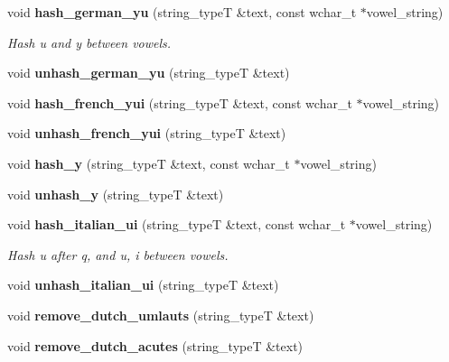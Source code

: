 \begin{DoxyCompactItemize}
\item 
void {\bf hash\+\_\+german\+\_\+yu} (string\+\_\+typeT \&text, const wchar\+\_\+t $\ast$vowel\+\_\+string)\label{classstemming_1_1stem_a2ab335f89cb2e65564a7985156d6ce19}

\begin{DoxyCompactList}\small\item\em Hash \textquotesingle{}u\textquotesingle{} and \textquotesingle{}y\textquotesingle{} between vowels. \end{DoxyCompactList}\item 
void {\bfseries unhash\+\_\+german\+\_\+yu} (string\+\_\+typeT \&text)\label{classstemming_1_1stem_a70ee7015775ebb7d8b98a1724f94448e}

\item 
void {\bf hash\+\_\+french\+\_\+yui} (string\+\_\+typeT \&text, const wchar\+\_\+t $\ast$vowel\+\_\+string)
\item 
void {\bfseries unhash\+\_\+french\+\_\+yui} (string\+\_\+typeT \&text)\label{classstemming_1_1stem_a11e5585424ce623ee7842a039bdfb7cb}

\item 
void {\bfseries hash\+\_\+y} (string\+\_\+typeT \&text, const wchar\+\_\+t $\ast$vowel\+\_\+string)\label{classstemming_1_1stem_ab7cc895f7a16b9bec4a4c4614111ecb3}

\item 
void {\bfseries unhash\+\_\+y} (string\+\_\+typeT \&text)\label{classstemming_1_1stem_acc93df08d3d68d2468aa3e7cf23c7089}

\item 
void {\bf hash\+\_\+italian\+\_\+ui} (string\+\_\+typeT \&text, const wchar\+\_\+t $\ast$vowel\+\_\+string)\label{classstemming_1_1stem_a11d05105fc3e03bd5f2ff581bc4eb6fe}

\begin{DoxyCompactList}\small\item\em Hash u after q, and u, i between vowels. \end{DoxyCompactList}\item 
void {\bfseries unhash\+\_\+italian\+\_\+ui} (string\+\_\+typeT \&text)\label{classstemming_1_1stem_ab4f2f7360665b96d941ba614dc3d5092}

\item 
void {\bfseries remove\+\_\+dutch\+\_\+umlauts} (string\+\_\+typeT \&text)\label{classstemming_1_1stem_a44d995c39f2a31089ae3505fb483cbfa}

\item 
void {\bfseries remove\+\_\+dutch\+\_\+acutes} (string\+\_\+typeT \&text)\label{classstemming_1_1stem_a42ba7697636adbf2d757c360a981920f}


\end{DoxyCompactItemize}
